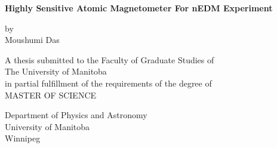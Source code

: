 \documentclass[12pt]{report}
\begin{document}
\begin{titlepage}
    \begin{center}
        \vspace*{0.5cm}
        
        \large
        \textbf{Highly Sensitive Atomic Magnetometer For nEDM Experiment }
        
        \vspace{0.5cm}
        \large
        
        
        \vspace{1.5cm}
        by\\
        \vspace{0.9cm}
        Moushumi Das
        \vfill
        
%
       \vspace{1.5cm}
       A thesis submitted to the Faculty of Graduate Studies of\\ The University of Manitoba\\
       in partial fulfillment of the requirements of the degree of\\
        \vspace{1.2cm}
        MASTER OF SCIENCE
        \Large
        \vspace{0.8cm}
        
        \large
        Department of Physics and Astronomy\\
        University of Manitoba\\
        Winnipeg
  
        
    \end{center}
\end{titlepage}
\end{document}
